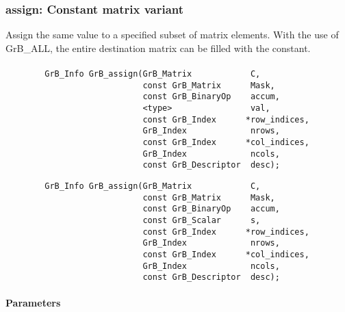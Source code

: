 




\subsubsection{{\sf assign}: Constant matrix variant}

Assign the same value to a specified subset of matrix elements.  With the use of 
{\sf GrB\_ALL}, the entire destination matrix can be filled with the constant.

\paragraph{\syntax}

\begin{verbatim}
        GrB_Info GrB_assign(GrB_Matrix            C,
                            const GrB_Matrix      Mask,
                            const GrB_BinaryOp    accum,
                            <type>                val,
                            const GrB_Index      *row_indices,
                            GrB_Index             nrows,
                            const GrB_Index      *col_indices,
                            GrB_Index             ncols,
                            const GrB_Descriptor  desc);
\end{verbatim}

\begin{verbatim}
        GrB_Info GrB_assign(GrB_Matrix            C,
                            const GrB_Matrix      Mask,
                            const GrB_BinaryOp    accum,
                            const GrB_Scalar      s,
                            const GrB_Index      *row_indices,
                            GrB_Index             nrows,
                            const GrB_Index      *col_indices,
                            GrB_Index             ncols,
                            const GrB_Descriptor  desc);
\end{verbatim}

\paragraph{Parameters}

